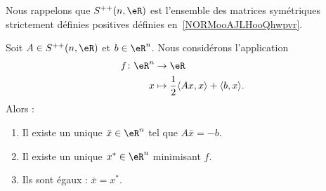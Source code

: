 Nous rappelons que \( S^{++}(n,\eR)\) est l'ensemble des matrices symétriques strictement définies positives définies en~\ref{NORMooAJLHooQhwpvr}.
\begin{proposition}     \label{PROPooYRLDooTwzfWU}
	Soit \( A\in S^{++}(n,\eR)\) et \( b\in \eR^n\). Nous considérons l'application
	\begin{equation}
		\begin{aligned}
			f\colon \eR^n & \to \eR                                                          \\
			x             & \mapsto \frac{ 1 }{2}\langle Ax, x\rangle +\langle b, x\rangle .
		\end{aligned}
	\end{equation}
	Alors :
	\begin{enumerate}
		\item
		      Il existe un unique \( \bar x\in \eR^n\) tel que \( A\bar x=-b\).
		\item
		      Il existe un unique \( x^*\in \eR^n\) minimisant \( f\).
		\item
		      Ils sont égaux : \( \bar x=x^*\).
	\end{enumerate}
\end{proposition}

